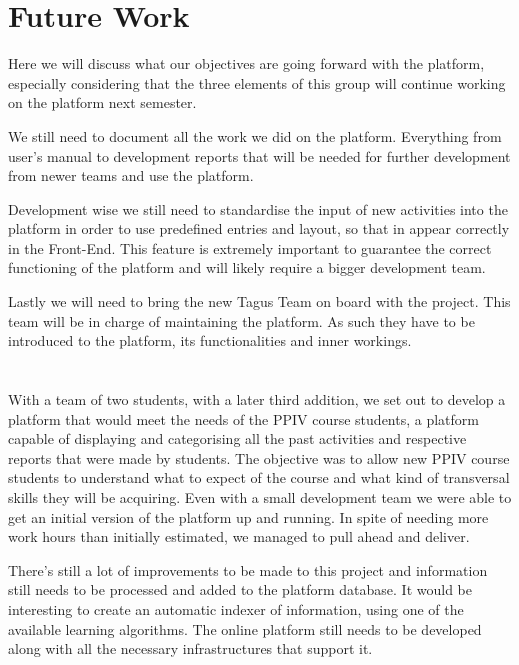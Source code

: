 \documentclass[a4paper,12pt,journal,twoside,compsoc]{PPIEEEtran}
\begin{document}

\section{Future Work}

Here we will discuss what our objectives are going forward with the platform, especially considering that the three elements of this group will continue working on the platform next semester.

We still need to document all the work we did on the platform. Everything from user's manual to development reports that will be needed for further development from newer teams and use the platform.

Development wise we still need to standardise the input of new activities into the platform in order to use predefined entries and layout, so that in appear correctly in the Front-End. This feature is extremely important to guarantee the correct functioning of the platform and will likely require a bigger development team.

Lastly we will need to bring the new Tagus Team on board with the project. This team will be in charge of maintaining the platform. As such they have to be introduced to the platform, its functionalities and inner workings.

\section{}

With a team of two students, with a later third addition, we set out to develop a platform that would meet the needs of the PPIV course students, a platform capable of displaying and categorising all the past activities and respective reports that were made by students. The objective was to allow new PPIV course students to understand what to expect of the course and what kind of  transversal skills they will be acquiring. Even with a small development team we were able to get an initial version of the platform up and running. In spite of needing more work hours than initially estimated, we managed to pull ahead and deliver.

There's still a lot of improvements to be made to this project and information still needs to be processed and added to the platform database. It would be interesting to create an automatic indexer of information, using one of the available learning algorithms. The online platform still needs to be developed along with all the necessary infrastructures that support it.
\end{document}
